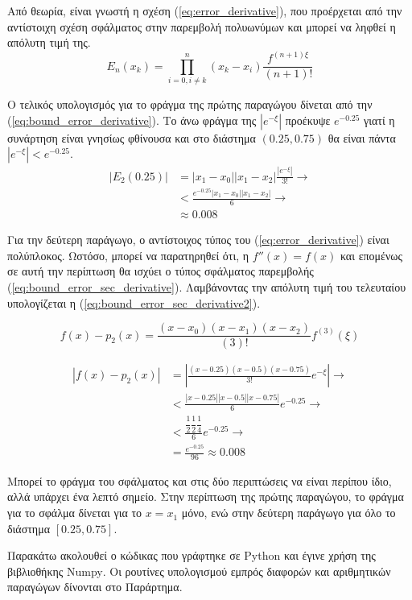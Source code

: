 \documentclass[assignment3.tex]{subfiles}
\begin{document}
Από θεωρία, είναι γνωστή η σχέση (\ref{eq:error_derivative}), που προέρχεται από την αντίστοιχη σχέση σφάλματος στην παρεμβολή πολυωνύμων και μπορεί να ληφθεί η απόλυτη τιμή της.
\begin{equation}
E_n(x_k) = \prod_{i=0,i\neq k}^{n}(x_k-x_i)\frac{f^{(n+1)\xi}}{(n+1)!}
\label{eq:error_derivative}
\end{equation}

Ο τελικός υπολογισμός για το φράγμα της πρώτης παραγώγου δίνεται από την (\ref{eq:bound_error_derivative}). Το άνω φράγμα της $|e^{-\xi}|$ προέκυψε $e^{-0.25}$ γιατί η συνάρτηση είναι γνησίως φθίνουσα και στο διάστημα $(0.25, 0.75)$ θα είναι πάντα $|e^{-\xi}| < e^{-0.25}$.
\begin{equation}
\begin{split}
|E_2(0.25)| &= |x_1-x_0||x_1-x_2|\frac{|e^{-\xi}|}{3!}\rightarrow \\
& < \frac{e^{-0.25}|x_1-x_0||x_1-x_2|}{6} \rightarrow \\
&\approx 0.008
\end{split}
\label{eq:bound_error_derivative}
\end{equation}

Για την δεύτερη παράγωγο, ο αντίστοιχος τύπος του (\ref{eq:error_derivative}) είναι πολύπλοκος. Ωστόσο, μπορεί να παρατηρηθεί ότι, η $f''(x)=f(x)$ και επομένως σε αυτή την περίπτωση θα ισχύει ο τύπος σφάλματος παρεμβολής (\ref{eq:bound_error_sec_derivative}). Λαμβάνοντας την απόλυτη τιμή του τελευταίου υπολογίζεται η (\ref{eq:bound_error_sec_derivative2}).

\begin{equation}
f(x)-p_2(x)=\frac{(x-x_0)(x-x_1)(x-x_2)}{(3)!}f^{(3)}(\xi)
\label{eq:bound_error_sec_derivative}
\end{equation}

\begin{equation}
\begin{split}
|f(x)-p_2(x)|&=\left|\frac{(x-0.25)(x-0.5)(x-0.75)}{3!}e^{-\xi}\right| \rightarrow \\
&< \frac{|x-0.25||x-0.5||x-0.75|}{6}e^{-0.25}\rightarrow \\
& < \frac{\dfrac{1}{2} \dfrac{1}{2} \dfrac{1}{4}}{6} e^{-0.25}\rightarrow \\
&=\frac{e^{-0.25}}{96} \approx 0.008
\end{split}
\label{eq:bound_error_sec_derivative2}
\end{equation}

Μπορεί το φράγμα του σφάλματος και στις δύο περιπτώσεις να είναι περίπου ίδιο, αλλά υπάρχει ένα λεπτό σημείο. Στην περίπτωση της πρώτης παραγώγου, το φράγμα για το σφάλμα δίνεται για το $x=x_1$ μόνο, ενώ στην δεύτερη παράγωγο για όλο το διάστημα $[0.25, 0.75]$.

Παρακάτω ακολουθεί ο κώδικας που γράφτηκε σε \textlatin{Python} και έγινε χρήση της βιβλιοθήκης \textlatin{Numpy}. Οι ρουτίνες υπολογισμού εμπρός διαφορών και αριθμητικών παραγώγων δίνονται στο Παράρτημα.

\end{document}

